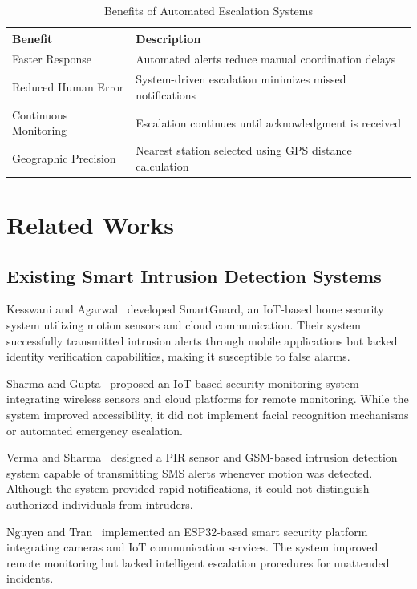 \documentclass[12pt,a4paper,oneside]{report}
\begin{document}
\begin{table}[htbp]
  \centering
  \caption{Benefits of Automated Escalation Systems}
  {\small
  \begin{tabular}{|p{5.00cm}|p{8.00cm}|}
    \hline
    \textbf{Benefit} & \textbf{Description} \\
    \hline
    Faster Response        & Automated alerts reduce manual coordination delays \\
    Reduced Human Error    & System-driven escalation minimizes missed notifications \\
    Continuous Monitoring  & Escalation continues until acknowledgment is received \\
    Geographic Precision   & Nearest station selected using GPS distance calculation \\
    \hline
  \end{tabular}
  }
\end{table}

\section{Related Works}

\subsection{Existing Smart Intrusion Detection Systems}

Kesswani and Agarwal~\cite{ref8} developed SmartGuard, an IoT-based home security system utilizing motion sensors and cloud communication. Their system successfully transmitted intrusion alerts through mobile applications but lacked identity verification capabilities, making it susceptible to false alarms.

Sharma and Gupta~\cite{ref13} proposed an IoT-based security monitoring system integrating wireless sensors and cloud platforms for remote monitoring. While the system improved accessibility, it did not implement facial recognition mechanisms or automated emergency escalation.

Verma and Sharma~\cite{ref14} designed a PIR sensor and GSM-based intrusion detection system capable of transmitting SMS alerts whenever motion was detected. Although the system provided rapid notifications, it could not distinguish authorized individuals from intruders.

Nguyen and Tran~\cite{ref15} implemented an ESP32-based smart security platform integrating cameras and IoT communication services. The system improved remote monitoring but lacked intelligent escalation procedures for unattended incidents.
\end{document}
